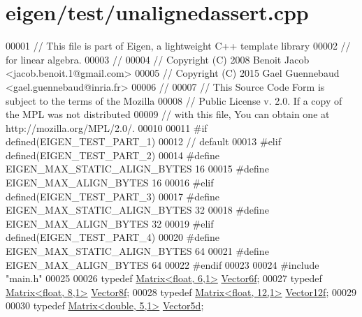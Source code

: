 \hypertarget{eigen_2test_2unalignedassert_8cpp_source}{}\section{eigen/test/unalignedassert.cpp}
\label{eigen_2test_2unalignedassert_8cpp_source}

\begin{DoxyCode}
00001 \textcolor{comment}{// This file is part of Eigen, a lightweight C++ template library}
00002 \textcolor{comment}{// for linear algebra.}
00003 \textcolor{comment}{//}
00004 \textcolor{comment}{// Copyright (C) 2008 Benoit Jacob <jacob.benoit.1@gmail.com>}
00005 \textcolor{comment}{// Copyright (C) 2015 Gael Guennebaud <gael.guennebaud@inria.fr>}
00006 \textcolor{comment}{//}
00007 \textcolor{comment}{// This Source Code Form is subject to the terms of the Mozilla}
00008 \textcolor{comment}{// Public License v. 2.0. If a copy of the MPL was not distributed}
00009 \textcolor{comment}{// with this file, You can obtain one at http://mozilla.org/MPL/2.0/.}
00010 
00011 \textcolor{preprocessor}{#if defined(EIGEN\_TEST\_PART\_1)}
00012   \textcolor{comment}{// default}
00013 \textcolor{preprocessor}{#elif defined(EIGEN\_TEST\_PART\_2)}
00014 \textcolor{preprocessor}{  #define EIGEN\_MAX\_STATIC\_ALIGN\_BYTES 16}
00015 \textcolor{preprocessor}{  #define EIGEN\_MAX\_ALIGN\_BYTES 16}
00016 \textcolor{preprocessor}{#elif defined(EIGEN\_TEST\_PART\_3)}
00017 \textcolor{preprocessor}{  #define EIGEN\_MAX\_STATIC\_ALIGN\_BYTES 32}
00018 \textcolor{preprocessor}{  #define EIGEN\_MAX\_ALIGN\_BYTES 32}
00019 \textcolor{preprocessor}{#elif defined(EIGEN\_TEST\_PART\_4)}
00020 \textcolor{preprocessor}{  #define EIGEN\_MAX\_STATIC\_ALIGN\_BYTES 64}
00021 \textcolor{preprocessor}{  #define EIGEN\_MAX\_ALIGN\_BYTES 64}
00022 \textcolor{preprocessor}{#endif}
00023 
00024 \textcolor{preprocessor}{#include "main.h"}
00025 
00026 \textcolor{keyword}{typedef} \hyperlink{group___core___module_class_eigen_1_1_matrix}{Matrix<float,  6,1>} \hyperlink{group___core___module_class_eigen_1_1_matrix}{Vector6f};
00027 \textcolor{keyword}{typedef} \hyperlink{group___core___module}{Matrix<float,  8,1>} \hyperlink{group___core___module}{Vector8f};
00028 \textcolor{keyword}{typedef} \hyperlink{group___core___module_class_eigen_1_1_matrix}{Matrix<float, 12,1>} \hyperlink{group___core___module_class_eigen_1_1_matrix}{Vector12f};
00029 
00030 \textcolor{keyword}{typedef} \hyperlink{group___core___module_class_eigen_1_1_matrix}{Matrix<double, 5,1>} \hyperlink{group___core___module_class_eigen_1_1_matrix}{Vector5d};

\end{DoxyCode}

